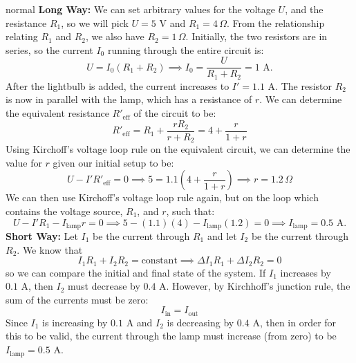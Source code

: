 \begin{solution}{normal}
\textbf{Long Way:} We can set arbitrary values for the voltage $U$, and the resistance $R_1$, so we will pick $U=5 \text{ V}$ and $R_1=4\,\Omega$. From the relationship relating $R_1$ and $R_2$, we also have $R_2 = 1\,\Omega$. Initially, the two resistors are in series, so the current $I_0$ running through the entire circuit is:
$$U = I_0(R_1+R_2) \implies I_0 = \frac{U}{R_1+R_2} = 1 \text{ A}.$$After the lightbulb is added, the current increases to $I'=1.1 \text{ A}$. The resistor $R_2$ is now in parallel with the lamp, which has a resistance of $r$. We can determine the equivalent resistance $R'_\text{eff}$ of the circuit to be:
$$R'_\text{eff} = R_1 + \frac{rR_2}{r+R_2} = 4 + \frac{r}{1+r}$$Using Kirchoff's voltage loop rule on the equivalent circuit, we can determine the value for $r$ given our initial setup to be:
$$U - I'R'_\text{eff} = 0 \implies 5 = 1.1\left(4 + \frac{r}{1+r}\right) \implies r = 1.2\,\Omega$$We can then use Kirchoff's voltage loop rule again, but on the loop which contains the voltage source, $R_1$, and $r$, such that:
$$U - I'R_1 - I_\text{lamp}r = 0 \implies 5 - (1.1)(4) - I_\text{lamp}(1.2) = 0 \implies \boxed{I_\text{lamp} = 0.5\text{ A}}.$$
\tcbline
\textbf{Short Way:} Let $I_1$ be the current through $R_1$ and let $I_2$ be the current through $R_2$. We know that$$I_1R_1+I_2R_2=\text{constant} \implies \Delta I_1 R_1 + \Delta I_2 R_2 = 0$$so we can compare the initial and final state of the system. If $I_1$ increases by $0.1 \text{ A}$, then $I_2$ must decrease by $0.4\text{ A}$. However, by Kirchhoff's junction rule, the sum of the currents must be zero:
$$I_\text{in} = I_\text{out}$$Since $I_1$ is increasing by $0.1\text{ A}$ and $I_2$ is decreasing by $0.4 \text{ A}$, then in order for this to be valid, the current through the lamp must increase (from zero) to be $\boxed{I_\text{lamp} = 0.5\text{ A}}$.
\end{solution}